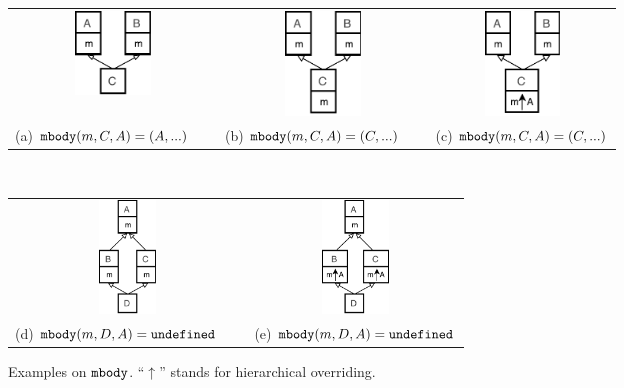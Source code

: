 \begin{figure}[t]
    \centering
    \vspace{-1ex}
    \begin{tabular}{ccc}
        \includegraphics[width=2cm]{pics/p1.pdf}\hspace{4pt} &
        \includegraphics[width=2cm]{pics/p2.pdf}\hspace{4pt} &
        \includegraphics[width=2cm]{pics/p3.pdf}\hspace{4pt} \\
        (a) $\texttt{mbody}(m,C,A) = (A,...)$\ \ \  & (b) $\texttt{mbody}(m,C,A) = (C,...)$\ \ \  & (c) $\texttt{mbody}(m,C,A) = (C,...)$
    \end{tabular} \\
   \begin{tabular}{cc}
    \includegraphics[height=3cm]{pics/p4.pdf}\hspace{4pt} &
    \includegraphics[height=3cm]{pics/p5.pdf}\hspace{4pt} \\ 
    (d) $\texttt{mbody}(m,D,A) = \texttt{undefined}$\ \ \  & (e) $\texttt{mbody}(m,D,A) = \texttt{undefined}$
   \end{tabular}
    \caption{Examples on $\texttt{mbody}$. ``$\uparrow$'' stands for hierarchical overriding.}\label{fig:examplesmbody}
\end{figure}

